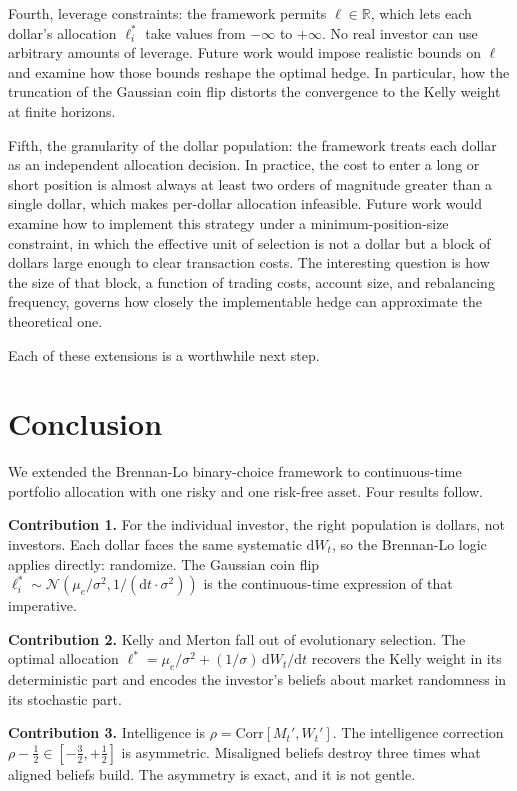 \documentclass[11pt]{article}
\newcommand{\lopt}{\ell^{*}}
\newcommand{\mue}{\mu_{e}}
\newcommand{\Corr}{\mathrm{Corr}}
\newcommand{\dd}{\mathrm{d}}
\begin{document}
Fourth, leverage constraints: the framework permits $\ell \in
\mathbb{R}$, which lets each dollar's allocation $\lopt_{i}$ take
values from $-\infty$ to $+\infty$. No real investor can use
arbitrary amounts of leverage. Future work would impose realistic
bounds on $\ell$ and examine how those bounds reshape the optimal
hedge. In particular, how the truncation of the Gaussian coin flip
distorts the convergence to the Kelly weight at finite horizons.

Fifth, the granularity of the dollar population: the framework treats
each dollar as an independent allocation decision. In practice, the
cost to enter a long or short position is almost always at least
two orders of magnitude greater than a single dollar, which makes
per-dollar allocation infeasible. Future work would examine how to
implement this strategy under a minimum-position-size constraint, in
which the effective unit of selection is not a dollar but a block of
dollars large enough to clear transaction costs. The interesting
question is how the size of that block, a function of trading costs, account size, and rebalancing frequency, governs how closely
the implementable hedge can approximate the theoretical one.

Each of these extensions is a worthwhile next step.

\section{Conclusion}

We extended the Brennan-Lo binary-choice framework to continuous-time
portfolio allocation with one risky and one risk-free asset. Four
results follow.

\textbf{Contribution 1.} For the individual investor, the right
population is dollars, not investors. Each dollar faces the same
systematic $\dd W_{t}$, so the Brennan-Lo logic applies directly:
randomize. The Gaussian coin flip
$\lopt_{i} \sim \mathcal{N}(\mue/\sigma^{2}, 1/(\dd t\cdot\sigma^{2}))$
is the continuous-time expression of that imperative.

\textbf{Contribution 2.} Kelly and Merton fall out of evolutionary
selection. The optimal allocation
$\lopt = \mue/\sigma^{2} + (1/\sigma)\,\dd W_{t}/\dd t$
recovers the Kelly weight in its deterministic part and encodes the
investor's beliefs about market randomness in its stochastic part.

\textbf{Contribution 3.} Intelligence is $\rho = \Corr[M_{t}',
W_{t}']$. The intelligence correction $\rho - \tfrac{1}{2} \in
[-\tfrac{3}{2}, +\tfrac{1}{2}]$ is asymmetric. Misaligned beliefs
destroy three times what aligned beliefs build. The asymmetry is
exact, and it is not gentle.
\end{document}
